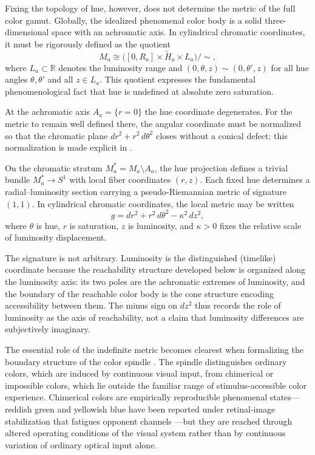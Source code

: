 \documentclass[preprint,12pt,authoryear]{elsarticle}
\theoremstyle{plain}
\theoremstyle{definition}
\theoremstyle{remark}
\begin{document}
Fixing the topology of hue, however, does not determine the metric of the full color gamut. Globally, the idealized phenomenal color body is a solid three-dimensional space with an achromatic axis. In cylindrical chromatic coordinates, it must be rigorously defined as the quotient
\[
M_a \cong \bigl([0,R_a]\times \widetilde{H}_a\times L_a\bigr)/{\sim},
\]
where $L_a\subset\mathbb{R}$ denotes the luminosity range and $(0,\theta,z)\sim(0,\theta',z)$ for all hue angles $\theta,\theta'$ and all $z\in L_a$. This quotient expresses the fundamental phenomenological fact that hue is undefined at absolute zero saturation.

At the achromatic axis $A_a=\{r=0\}$ the hue coordinate degenerates. For the metric to remain well defined there, the angular coordinate must be normalized so that the chromatic plane $dr^2+r^2\,d\theta^2$ closes without a conical defect; this normalization is made explicit in .

On the chromatic stratum $M_a^{\ast}=M_a\setminus A_a$, the hue projection defines a trivial bundle $M_a^{\ast}\longrightarrow S^1$ with local fiber coordinates $(r,z)$. Each fixed hue determines a radial--luminosity section carrying a pseudo-Riemannian metric of signature $(1,1)$. In cylindrical chromatic coordinates, the local metric may be written
\[
g = dr^2 + r^2\,d\theta^2 - \kappa^2\,dz^2,
\]
where $\theta$ is hue, $r$ is saturation, $z$ is luminosity, and $\kappa>0$ fixes the relative scale of luminosity displacement.

The signature is not arbitrary. Luminosity is the distinguished (timelike) coordinate because the reachability structure developed below is organized along the luminosity axis: its two poles are the achromatic extremes of luminosity, and the boundary of the reachable color body is the cone structure encoding accessibility between them. The minus sign on $dz^2$ thus records the role of luminosity as the axis of reachability, not a claim that luminosity differences are subjectively imaginary.

The essential role of the indefinite metric becomes clearest when formalizing the boundary structure of the color spindle \citep{Churchland2005}. The spindle distinguishes ordinary colors, which are induced by continuous visual input, from chimerical or impossible colors, which lie outside the familiar range of stimulus-accessible color experience. Chimerical colors are empirically reproducible phenomenal states---reddish green and yellowish blue have been reported under retinal-image stabilization that fatigues opponent channels \citep{CranePiantanida1983}---but they are reached through altered operating conditions of the visual system rather than by continuous variation of ordinary optical input alone.
\end{document}
